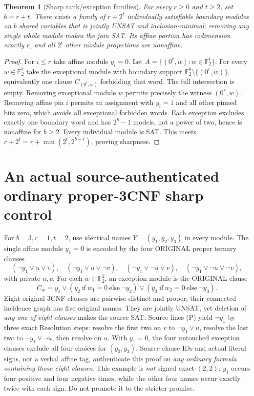\documentclass[11pt]{article}
\newtheorem{theorem}{Theorem}
\newcommand{\Ftwo}{\mathbb F_2}
\begin{document}
\begin{theorem}[Sharp rank/exception families]\label{th:sharp}
For every $r\ge0$ and $t\ge2$, set $b=r+t$. There exists a family of $r+2^t$ individually satisfiable boundary modules on $b$ shared variables that is jointly UNSAT and \emph{inclusion-minimal}: removing any single whole module makes the join SAT. Its affine portion has codimension exactly $r$, and all $2^t$ other module projections are nonaffine.
\end{theorem}
\begin{proof}
For $i\le r$ take affine module $y_i=0$. Let $A=\{(0^r,w):w\in\Ftwo^t\}$. For every $w\in\Ftwo^t$ take the exceptional module with boundary support $\Ftwo^b\setminus\{(0^r,w)\}$, equivalently one clause $C_{(0^r,w)}$ forbidding that word. The full intersection is empty. Removing exceptional module $w$ permits precisely the witness $(0^r,w)$. Removing affine pin $i$ permits an assignment with $y_i=1$ and all other pinned bits zero, which avoids all exceptional forbidden words. Each exception excludes exactly one boundary word and has $2^b-1$ models, not a power of two, hence is nonaffine for $b\ge2$. Every individual module is SAT. This meets $r+2^t=r+\min(2^t,2^{b-r})$, proving sharpness.
\end{proof}

\section{An actual source-authenticated ordinary proper-3CNF sharp control}
For $b=3,r=1,t=2$, use identical names $Y=(y_1,y_2,y_3)$ in every module. The single affine module $y_1=0$ is encoded by the four ORIGINAL proper ternary clauses
\begin{equation}
(\neg y_1\vee u\vee v),\quad (\neg y_1\vee u\vee\neg v),\quad
(\neg y_1\vee\neg u\vee v),\quad (\neg y_1\vee\neg u\vee\neg v), \tag{P}
\end{equation}
with private $u,v$. For each $w\in\Ftwo^2$, an exception module is the ORIGINAL clause
\[
C_w=y_1\vee (y_2\ \mathrm{if}\ w_1=0\ \mathrm{else}\ \neg y_2)
\vee (y_3\ \mathrm{if}\ w_2=0\ \mathrm{else}\ \neg y_3).
\]
Eight original 3CNF clauses are pairwise distinct and proper; their connected incidence graph has five original names. They are jointly UNSAT, yet deletion of \emph{any one of eight clauses} makes the source SAT. Source lines (P) yield $\neg y_1$ by three exact Resolution steps: resolve the first two on $v$ to $\neg y_1\vee u$, resolve the last two to $\neg y_1\vee\neg u$, then resolve on $u$. With $y_1=0$, the four untouched exception clauses exclude all four choices for $(y_2,y_3)$. Source clause IDs and actual literal signs, not a verbal affine tag, authenticate this proof on \emph{any ordinary formula containing those eight clauses}. This example is \emph{not} signed exact-$(2,2)$: $y_1$ occurs four positive and four negative times, while the other four names occur exactly twice with each sign. Do not promote it to the stricter promise.
\end{document}
